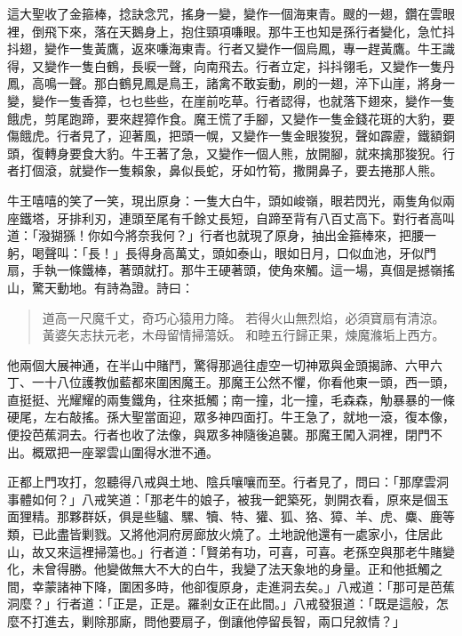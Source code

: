這大聖收了金箍棒，捻訣念咒，搖身一變，變作一個海東青。颼的一翅，鑽在雲眼裡，倒飛下來，落在天鵝身上，抱住頸項嗛眼。那牛王也知是孫行者變化，急忙抖抖翅，變作一隻黃鷹，返來嗛海東青。行者又變作一個烏鳳，專一趕黃鷹。牛王識得，又變作一隻白鶴，長唳一聲，向南飛去。行者立定，抖抖翎毛，又變作一隻丹鳳，高鳴一聲。那白鶴見鳳是鳥王，諸禽不敢妄動，刷的一翅，淬下山崖，將身一變，變作一隻香獐，乜乜些些，在崖前吃草。行者認得，也就落下翅來，變作一隻餓虎，剪尾跑蹄，要來趕獐作食。魔王慌了手腳，又變作一隻金錢花斑的大豹，要傷餓虎。行者見了，迎著風，把頭一幌，又變作一隻金眼狻猊，聲如霹靂，鐵額銅頭，復轉身要食大豹。牛王著了急，又變作一個人熊，放開腳，就來擒那狻猊。行者打個滾，就變作一隻賴象，鼻似長蛇，牙如竹筍，撒開鼻子，要去捲那人熊。

牛王嘻嘻的笑了一笑，現出原身：一隻大白牛，頭如峻嶺，眼若閃光，兩隻角似兩座鐵塔，牙排利刃，連頭至尾有千餘丈長短，自蹄至背有八百丈高下。對行者高叫道：「潑猢猻！你如今將奈我何？」行者也就現了原身，抽出金箍棒來，把腰一躬，喝聲叫：「長！」長得身高萬丈，頭如泰山，眼如日月，口似血池，牙似門扇，手執一條鐵棒，著頭就打。那牛王硬著頭，使角來觸。這一場，真個是撼嶺搖山，驚天動地。有詩為證。詩曰：
\begin{quote}
道高一尺魔千丈，奇巧心猿用力降。
若得火山無烈焰，必須寶扇有清涼。
黃婆矢志扶元老，木母留情掃蕩妖。
和睦五行歸正果，煉魔滌垢上西方。
\end{quote}

他兩個大展神通，在半山中賭鬥，驚得那過往虛空一切神眾與金頭揭諦、六甲六丁、一十八位護教伽藍都來圍困魔王。那魔王公然不懼，你看他東一頭，西一頭，直挺挺、光耀耀的兩隻鐵角，往來抵觸；南一撞，北一撞，毛森森，觔暴暴的一條硬尾，左右敲搖。孫大聖當面迎，眾多神四面打。牛王急了，就地一滾，復本像，便投芭蕉洞去。行者也收了法像，與眾多神隨後追襲。那魔王闖入洞裡，閉門不出。概眾把一座翠雲山圍得水泄不通。

正都上門攻打，忽聽得八戒與土地、陰兵嚷嚷而至。行者見了，問曰：「那摩雲洞事體如何？」八戒笑道：「那老牛的娘子，被我一鈀築死，剝開衣看，原來是個玉面狸精。那夥群妖，俱是些驢、騾、犢、特、獾、狐、狢、獐、羊、虎、麋、鹿等類，已此盡皆剿戮。又將他洞府房廊放火燒了。土地說他還有一處家小，住居此山，故又來這裡掃蕩也。」行者道：「賢弟有功，可喜，可喜。老孫空與那老牛賭變化，未曾得勝。他變做無大不大的白牛，我變了法天象地的身量。正和他抵觸之間，幸蒙諸神下降，圍困多時，他卻復原身，走進洞去矣。」八戒道：「那可是芭蕉洞麼？」行者道：「正是，正是。羅剎女正在此間。」八戒發狠道：「既是這般，怎麼不打進去，剿除那廝，問他要扇子，倒讓他停留長智，兩口兒敘情？」

